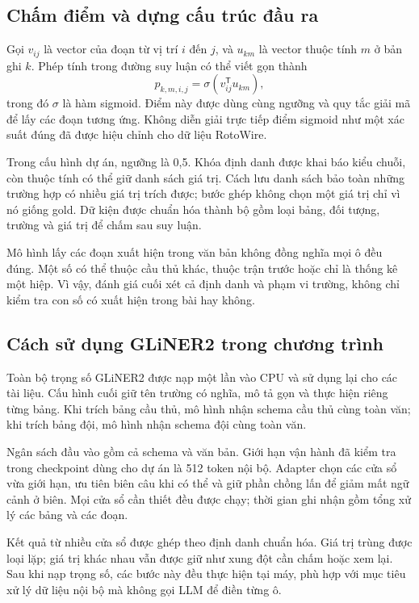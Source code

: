 \subsection{Chấm điểm và dựng cấu trúc đầu ra}
Gọi $v_{ij}$ là vector của đoạn từ vị trí $i$ đến $j$, và $u_{km}$ là vector thuộc tính $m$ ở bản ghi $k$. Phép tính trong đường suy luận có thể viết gọn thành
\begin{equation}
p_{k,m,i,j}=\sigma\!\left(v_{ij}^{\mathsf T}u_{km}\right),
\end{equation}
trong đó $\sigma$ là hàm sigmoid. Điểm này được dùng cùng ngưỡng và quy tắc giải mã để lấy các đoạn tương ứng. Không diễn giải trực tiếp điểm sigmoid như một xác suất đúng đã được hiệu chỉnh cho dữ liệu RotoWire.

Trong cấu hình dự án, ngưỡng là 0,5. Khóa định danh được khai báo kiểu chuỗi, còn thuộc tính có thể giữ danh sách giá trị. Cách lưu danh sách bảo toàn những trường hợp có nhiều giá trị trích được; bước ghép không chọn một giá trị chỉ vì nó giống gold. Dữ kiện được chuẩn hóa thành bộ gồm loại bảng, đối tượng, trường và giá trị để chấm sau suy luận.

Mô hình lấy các đoạn xuất hiện trong văn bản không đồng nghĩa mọi ô đều đúng. Một số có thể thuộc cầu thủ khác, thuộc trận trước hoặc chỉ là thống kê một hiệp. Vì vậy, đánh giá cuối xét cả định danh và phạm vi trường, không chỉ kiểm tra con số có xuất hiện trong bài hay không.

\subsection{Cách sử dụng GLiNER2 trong chương trình}
Toàn bộ trọng số GLiNER2 được nạp một lần vào CPU và sử dụng lại cho các tài liệu. Cấu hình cuối giữ tên trường có nghĩa, mô tả gọn và thực hiện riêng từng bảng. Khi trích bảng cầu thủ, mô hình nhận schema cầu thủ cùng toàn văn; khi trích bảng đội, mô hình nhận schema đội cùng toàn văn.

Ngân sách đầu vào gồm cả schema và văn bản. Giới hạn vận hành đã kiểm tra trong checkpoint dùng cho dự án là 512 token nội bộ. Adapter chọn các cửa sổ vừa giới hạn, ưu tiên biên câu khi có thể và giữ phần chồng lấn để giảm mất ngữ cảnh ở biên. Mọi cửa sổ cần thiết đều được chạy; thời gian ghi nhận gồm tổng xử lý các bảng và các đoạn.

Kết quả từ nhiều cửa sổ được ghép theo định danh chuẩn hóa. Giá trị trùng được loại lặp; giá trị khác nhau vẫn được giữ như xung đột cần chấm hoặc xem lại. Sau khi nạp trọng số, các bước này đều thực hiện tại máy, phù hợp với mục tiêu xử lý dữ liệu nội bộ mà không gọi LLM để điền từng ô.

